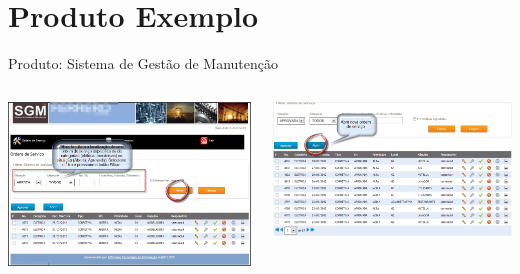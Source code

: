 \section{Produto Exemplo}
\begin{frame}{Produto: Sistema de Gestão de Manutenção}
	\begin{columns}
	  	\begin{column}{0.45\textwidth}
	  		\includegraphics[width=1\textwidth]{imagens/sgm-01}
	  	\end{column}
	  	\begin{column}{0.45\textwidth}
	  		\includegraphics[width=1\textwidth]{imagens/sgm-02}
	  	\end{column}
	\end{columns}



	\framebreak
	

\end{frame}
